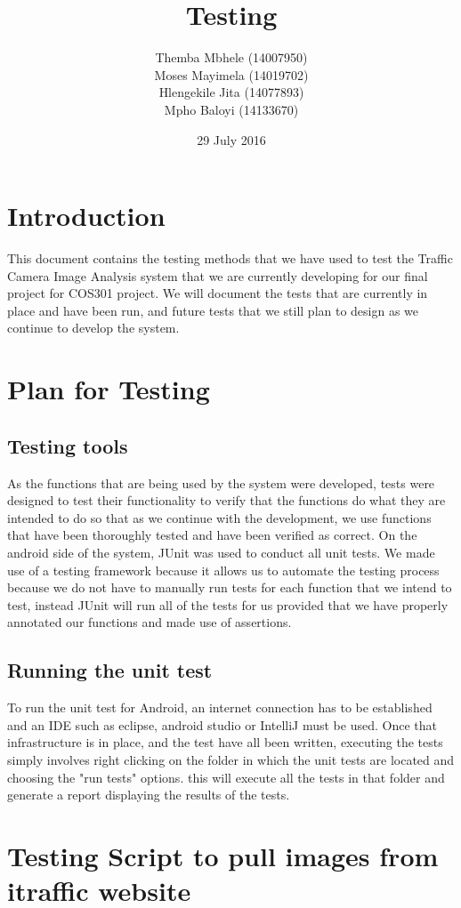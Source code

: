 \documentclass{article}
\title{Testing}
\author{Themba Mbhele (14007950)\\
        Moses Mayimela (14019702)\\
        Hlengekile Jita (14077893)\\
        Mpho Baloyi (14133670)\\
        }
\date{29 July 2016}
\begin{document}
\maketitle

\section{Introduction}
This document contains the testing methods that we have used to test the Traffic Camera Image Analysis system that we are currently developing for our final project for COS301 project. We will document the tests that are currently in place and have been run, and future tests that we still plan to design as we continue to develop the system.

\section{Plan for Testing}
\subsection{Testing tools}
As the functions that are being used by the system were developed, tests were designed to test their functionality to verify that the functions do what they are intended to do so that as we continue with the development, we use functions that have been thoroughly tested and have been verified as correct.
On the android side of the system, JUnit was used to conduct all unit tests. We
made use of a testing framework because it allows us to automate the testing process because we do not have to manually run tests for each function that we intend to test, instead JUnit will run all of the tests for us provided that we
have properly annotated our functions and made use of assertions.
\subsection{Running the unit test}
To run the unit test for Android, an internet connection has to be established and an IDE such as eclipse, android studio or IntelliJ must be used. Once that infrastructure is in place, and the test have all been written, executing the tests simply involves right clicking on the folder in which the unit tests are located and choosing the "run tests" options. this will execute all the tests in that folder and generate a report displaying the results of the tests.
\section{Testing Script to pull images from itraffic website}
\end{document}
